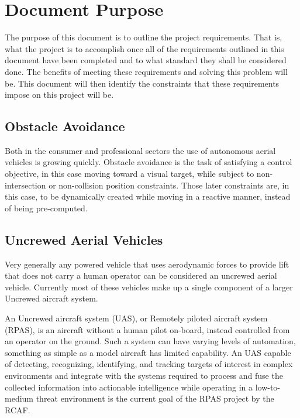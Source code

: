 \documentclass[]{report}
\begin{document}
\section{Document Purpose}

The purpose of this document is to outline the project requirements. That is, what the project is to accomplish once all of the requirements outlined in this document have been completed and to what standard they shall be considered done. The benefits of meeting these requirements and solving this problem will be. This document will then identify the constraints that these requirements impose on this project will be.

\subsection{Obstacle Avoidance}

Both in the consumer and professional sectors the use of autonomous aerial vehicles is growing quickly. 
Obstacle avoidance is the task of satisfying a control objective, in this case moving toward a visual target, while subject to non-intersection or non-collision position constraints. Those later constraints are, in this case, to be dynamically created while moving in a reactive manner, instead of being pre-computed.

\subsection{Uncrewed Aerial Vehicles}

Very generally any powered vehicle that uses aerodynamic forces to provide lift that does not carry a human operator can be considered an uncrewed aerial vehicle. Currently most of these vehicles make up a single component of a larger Uncrewed aircraft system. 

An Uncrewed aircraft system (UAS), or Remotely piloted aircraft system (RPAS), is an aircraft without a human pilot on-board, instead controlled from an operator on the ground. 
Such a system can have varying levels of automation, something as simple as a model aircraft has limited capability. An UAS capable of detecting, recognizing, identifying, and tracking targets of interest in complex environments and integrate with the systems required to process and fuse the collected information into actionable intelligence while operating in a low-to-medium threat environment is the current goal of the RPAS project by the RCAF. 
\end{document}
